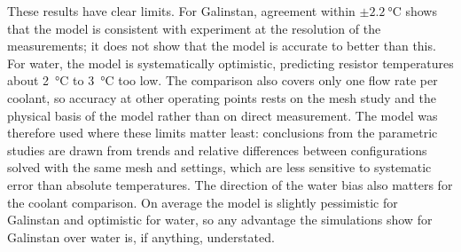These results have clear limits. For Galinstan, agreement within
$\pm\SI{2.2}{\celsius}$ shows that the model is consistent with experiment at
the resolution of the measurements; it does not show that the model is
accurate to better than this. For water, the model is systematically optimistic,
predicting resistor temperatures about \SI{2}{\celsius} to \SI{3}{\celsius} too
low. The comparison also covers only one flow rate per coolant, so accuracy at
other operating points rests on the mesh study and the physical basis of the
model rather than on direct measurement. The model was therefore used where
these limits matter least: conclusions from the parametric studies are drawn
from trends and relative differences between configurations solved with the
same mesh and settings, which are less sensitive to systematic error than
absolute temperatures. The direction of the water bias also matters for the
coolant comparison. On average the model is slightly pessimistic for Galinstan and
optimistic for water, so any advantage the simulations show for Galinstan over
water is, if anything, understated.
